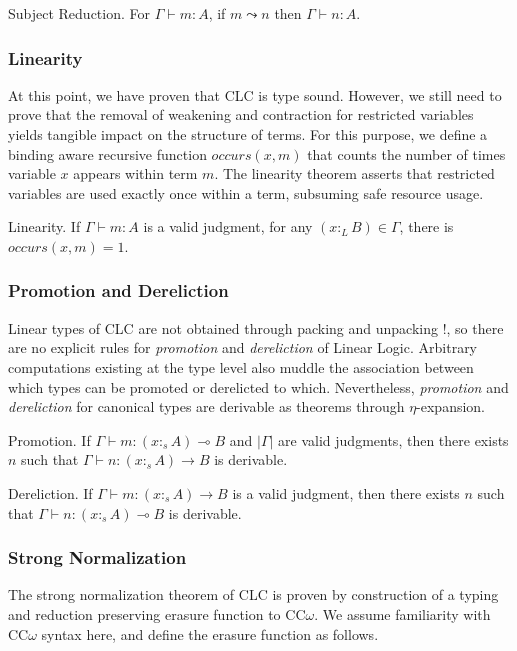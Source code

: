 \documentclass[sigplan,screen,review,anonymous]{acmart}
\newcommand{\pure}[1]{|#1|}
\newcommand{\ltype}{:_{\scriptscriptstyle L}}
\newcommand{\stype}[1]{:_#1}
\newcommand{\pstep}{\leadsto}
\begin{document}
\begin{theorem}
  Subject Reduction. For $\Gamma \vdash m : A$, if $m \pstep n$ then $\Gamma \vdash n : A$.
\end{theorem}

\subsubsection{Linearity}
At this point, we have proven that CLC is type sound. However, we still need to prove that the removal of weakening and contraction for restricted variables yields tangible impact on the structure of terms. For this purpose, we define a binding aware recursive function $occurs(x, m)$ that counts the number of times variable $x$ appears within term $m$. The linearity theorem asserts that restricted variables are used exactly once within a term, subsuming safe resource usage.

\begin{theorem}
  Linearity. If $\Gamma \vdash m : A$ is a valid judgment, for any $(x \ltype B) \in \Gamma$, there is $occurs(x, m) = 1$.
\end{theorem}

\subsubsection{Promotion and Dereliction}
Linear types of CLC are not obtained through packing and unpacking !, so there are no explicit rules for \textit{promotion} and \textit{dereliction} of Linear Logic. Arbitrary computations existing at the type level also muddle the association between which types can be promoted or derelicted to which. Nevertheless, \textit{promotion} and \textit{dereliction} for canonical types are derivable as theorems through $\eta$-expansion.

\begin{theorem}
  Promotion. If $\Gamma \vdash m : (x \stype{s} A) \multimap B$ and $\pure{\Gamma}$ are valid judgments, then there exists $n$ such that $\Gamma \vdash n : (x \stype{s} A) \rightarrow B$ is derivable.
\end{theorem}

\begin{theorem}
  Dereliction. If $\Gamma \vdash m : (x \stype{s} A) \rightarrow B$ is a valid judgment, then there exists $n$ such that $\Gamma \vdash n : (x \stype{s} A) \multimap B$ is derivable.
\end{theorem}

\subsubsection{Strong Normalization}
The strong normalization theorem of CLC is proven by construction of a typing and reduction preserving erasure function to CC$\omega$. We assume familiarity with CC$\omega$ syntax here, and define the erasure function as follows.
\end{document}
